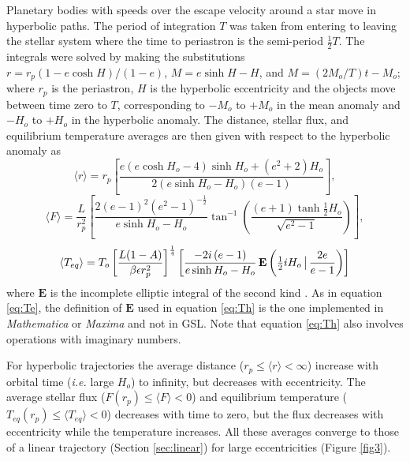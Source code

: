 \documentclass[a4paper,fleqn,usenatbib]{mnras}
\begin{document}
Planetary bodies with speeds over the escape velocity around a star move in hyperbolic paths. The period of integration $T$ was taken from entering to leaving the stellar system where the time to periastron is the semi-period $\frac{1}{2}T$. The integrals were solved by making the substitutions $r=r_p(1-e\cosh{H})/(1-e)$, $M=e\sinh{H} - H$, and $M=(2M_o/T)t - M_o$; where $r_p$ is the periastron, $H$ is the hyperbolic eccentricity and the objects move between time zero to $T$, corresponding to $-M_o$ to $+M_o$ in the mean anomaly and $-H_o$ to $+H_o$ in the hyperbolic anomaly. The distance, stellar flux, and equilibrium temperature averages are then given with respect to the hyperbolic anomaly as
\begin{equation} \label{eq:rh}
\langle r \rangle = r_p \left[\frac{e \left(e \cosh{H_o} - 4\right) \sinh{H_o} + \left(e^{2} + 2\right) H_o}{2\left(e \sinh{H_o} - H_o\right) \left( e-1 \right) } \right],
\end{equation}
\begin{equation} \label{eq:Fh}
\langle F \rangle = \frac{L}{r_p^2} \left[ \frac{2 \left( e - 1 \right)^2 \left(e^2 - 1\right)^{-\frac{1}{2}}}{e \sinh{H_o} - H_o}\tan^{-1}\left({\frac{\left(e + 1\right) \tanh{\frac{1}{2}H_o}}{\sqrt{e^2 - 1}}}\right) \right],
\end{equation}
\begin{equation} \label{eq:Th}
\langle T_{eq} \rangle = T_o \left[\frac{L {\left(1 - A\right)}}{\beta \epsilon r_p^{2}}\right]^{\frac{1}{4}} \left[ \frac{-2 i \left(e-1\right)}{e \sinh{H_o} - H_o} \, {\rm \mathbf{E}}\left(\tfrac{1}{2}iH_o \, \big| \, \frac{2e}{e - 1}\right) \right]
\end{equation}
where $\mathbf{E}$ is the incomplete elliptic integral of the second kind \citep{MathWorld, GSL}. As in equation \ref{eq:Te}, the definition of $\mathbf{E}$ used in equation \ref{eq:Th} is the one implemented in \emph{Mathematica} or \emph{Maxima} and not in GSL. Note that equation \ref{eq:Th} also involves operations with imaginary numbers.


For hyperbolic trajectories the average distance ($r_p \leq \langle r \rangle < \infty$) increase with orbital time (\emph{i.e.} large $H_o$) to infinity, but decreases with eccentricity. The average stellar flux ($F(r_p) \leq \langle F \rangle < 0$) and equilibrium temperature ($T_{eq}(r_p) \leq \langle T_{eq} \rangle < 0$) decreases with time to zero, but the flux decreases with eccentricity while the temperature increases. All these averages converge to those of a linear trajectory (Section \ref{sec:linear}) for large eccentricities (Figure \ref{fig3}).
\end{document}
